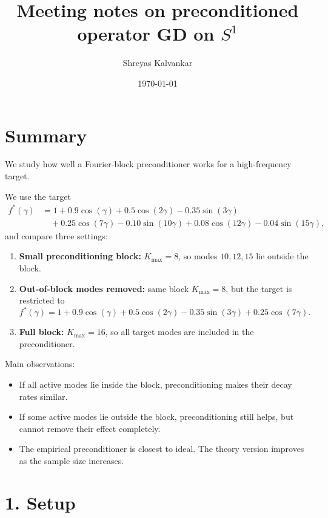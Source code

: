 \documentclass[11pt]{article}
\title{Meeting notes on preconditioned operator GD on $S^1$}
\author{Shreyas Kalvankar}
\date{\today}
\begin{document}
\maketitle

\section*{Summary}

We study how well a Fourier-block preconditioner works for a high-frequency target.

We use the target
\begin{align*}
	f^*(\gamma)
	 & =
	1
	+0.9\cos(\gamma)
	+0.5\cos(2\gamma)
	-0.35\sin(3\gamma) \\
	 & \quad
	+0.25\cos(7\gamma)
	-0.10\sin(10\gamma)
	+0.08\cos(12\gamma)
	-0.04\sin(15\gamma),
\end{align*}
and compare three settings:

\begin{enumerate}
	\item \textbf{Small preconditioning block:} $K_{\max}=8$, so modes $10,12,15$ lie outside the block.

	\item \textbf{Out-of-block modes removed:} same block $K_{\max}=8$, but the target is restricted to
	      \[
		      f^*(\gamma)
		      =
		      1
		      +0.9\cos(\gamma)
		      +0.5\cos(2\gamma)
		      -0.35\sin(3\gamma)
		      +0.25\cos(7\gamma).
	      \]

	\item \textbf{Full block:} $K_{\max}=16$, so all target modes are included in the preconditioner.
\end{enumerate}

Main observations:
\begin{itemize}
	\item If all active modes lie inside the block, preconditioning makes their decay rates similar.
	\item If some active modes lie outside the block, preconditioning still helps, but cannot remove their effect completely.
	\item The empirical preconditioner is closest to ideal. The theory version improves as the sample size increases.
\end{itemize}

\section*{1. Setup}
\end{document}
